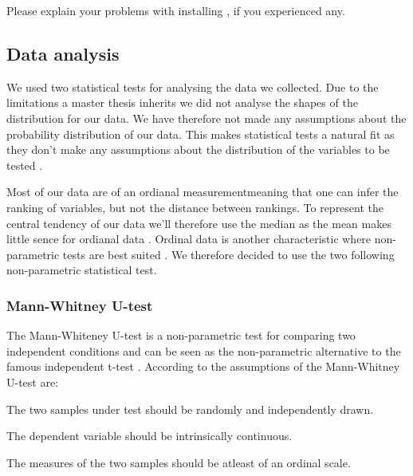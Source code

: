 \begin{items}
  \item Please explain your problems with installing \latest{}, if you
    experienced any.
\end{items}

\subsection{Data analysis}

We used two statistical tests for analysing the data we collected. Due to the
limitations a master thesis inherits we did not analyse the shapes of the
distribution for our data. We have therefore not made any assumptions about
the probability distribution of our data. This makes
 statistical tests a natural fit as they don't make any
assumptions about the distribution of the variables to be tested
\citep{wikipedia08nonparametric}.

Most of our data are of an ordianal measurement\dash{}meaning that one can
infer the ranking of variables, but not the distance between rankings.
To represent the central tendency of our data we'll therefore use the median
as the mean makes little sence for ordianal data
\citep{wikipedia08levelofmeasurement}.
Ordinal data is another characteristic where non-parametric tests
are best suited \citep{wikipedia08nonparametric}. We therefore decided
to use the two following non-parametric statistical test.

\subsubsection{Mann-Whitney U-test}

The Mann-Whiteney U-test is a non-parametric test for comparing two
independent conditions and can be seen as the non-parametric alternative to
the famous independent t-test \citep[]{field05}.
According to \citet[]{lowry08} the assumptions of the
Mann-Whitney U-test are:

\begin{enum}
  \item The two samples under test should be randomly and independently drawn.
  \item The dependent variable should be intrinsically continuous.
  \item The measures of the two samples should be atleast of an ordinal scale.
\end{enum}

